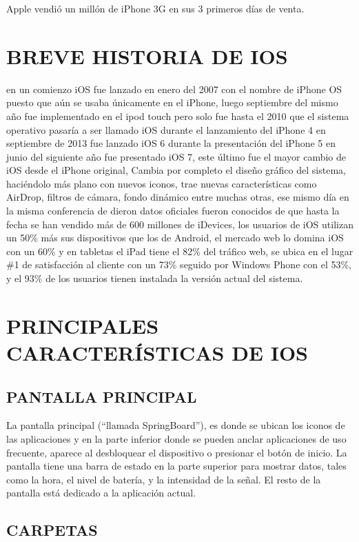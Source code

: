 Apple vendió un millón de iPhone 3G en sus 3 primeros días de
venta.

\section*{BREVE HISTORIA DE IOS}
en un comienzo iOS fue lanzado en enero del 2007 con el
nombre de iPhone OS puesto que aún se usaba únicamente en el
iPhone, luego septiembre del mismo año fue implementado en
el ipod touch pero solo fue hasta el 2010 que el sistema
operativo pasaría a ser llamado iOS durante el lanzamiento del
iPhone 4 en septiembre de 2013 fue lanzado iOS 6 durante la
presentación del iPhone 5 en junio del siguiente año fue
presentado iOS 7, este último fue el mayor cambio de iOS desde
el iPhone original, Cambia por completo el diseño gráfico del
sistema, haciéndolo más plano con nuevos iconos, trae nuevas
características como AirDrop, filtros de cámara, fondo dinámico
entre muchas otras, ese mismo día en la misma conferencia de
dieron datos oficiales fueron conocidos de que hasta la fecha se
han vendido más de 600 millones de iDevices, los usuarios de
iOS utilizan un 50\% más sus dispositivos que los de Android, el
mercado web lo domina iOS con un 60\% y en tabletas el iPad
tiene el 82\% del tráfico web, se ubica en el lugar \#1 de
satisfacción al cliente con un 73\% seguido por Windows Phone
con el 53\%, y el 93\% de los usuarios tienen instalada la versión
actual del sistema.

\section*{PRINCIPALES CARACTERÍSTICAS DE IOS}
\subsection*{PANTALLA PRINCIPAL}

La pantalla principal (“llamada SpringBoard”), es donde se
ubican los iconos de las aplicaciones y en la parte inferior
donde se pueden anclar aplicaciones de uso frecuente, aparece
al desbloquear el dispositivo o presionar el botón de inicio. La
pantalla tiene una barra de estado en la parte superior para
mostrar datos, tales como la hora, el nivel de batería, y la
intensidad de la señal. El resto de la pantalla está dedicado a la
aplicación actual.

\subsection*{CARPETAS}

